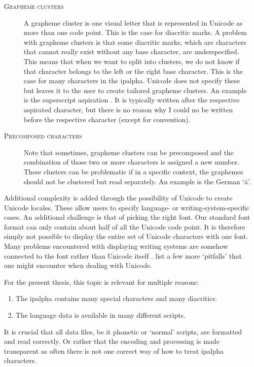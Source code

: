 \begin{description}
\item[\textsc{Grapheme clusters}] A grapheme cluster is one visual letter that is represented in Unicode as more than one code point. This is the case for diacritic marks. A problem with grapheme clusters is that some diacritic marks, which are characters that cannot really exist without any base character, are underspecified. This means that when we want to split into clusters, we do not know if that character belongs to the left or the right base character. This is the case for many characters in the \ac{ipalpha}. Unicode does not specify these but leaves it to the user to create tailored grapheme clusters. An example is the superscript aspiration . It is typically written after the respective aspirated character, but there is no reason why I could no be written before the respective character (except for convention).
\item[\textsc{Precomposed characters}] Note that sometimes, grapheme clusters can be precomposed and the combination of those two or more characters is assigned a new number. These clusters can be problematic if in a specific context, the graphemes should not be clustered but read separately. An example is the German `ä'. 
\end{description} 

Additional complexity is added through the possibility of Unicode to create Unicode locales. These allow users to specify language- or writing-system-specific cases. An additional challenge is that of picking the right font. Our standard font format can only contain about half of all the Unicode code point. It is therefore simply not possible to display the entire set of Unicode characters with one font. Many problems encountered with displaying writing systems are somehow connected to the font rather than Unicode itself \citep{unicode-lingu}. \citet{unicode-lingu} list a few more `pitfalls' that one might encounter when dealing with Unicode.

For the present thesis, this topic is relevant for multiple reasons: 
\begin{enumerate}
\item The \ac{ipalpha} contains many special characters and many diacritics.
\item The language data is available in many different scripts.
\end{enumerate} 

It is crucial that all data files, be it phonetic or `normal' scripts, are formatted and read correctly. Or rather that the encoding and processing is made transparent as often there is not one correct way of how to treat \ac{ipalpha} characters. 

